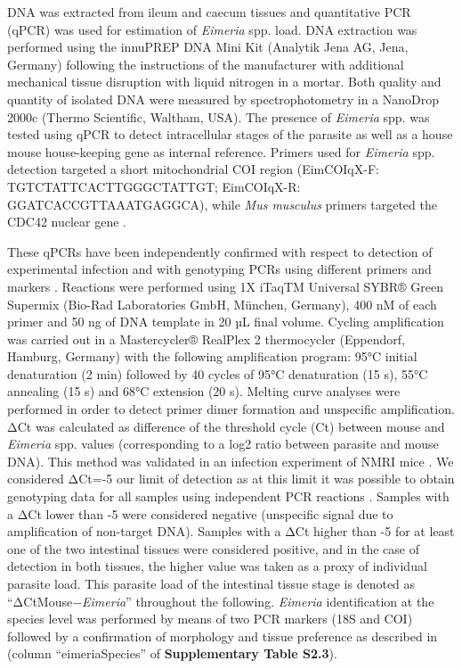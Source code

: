 \par 
DNA was extracted from ileum and caecum tissues and quantitative PCR (qPCR) was used for estimation of \textit{Eimeria} spp. load. DNA extraction was performed using the innuPREP DNA Mini Kit (Analytik Jena AG, Jena, Germany) following the instructions of the manufacturer with additional mechanical tissue disruption with liquid nitrogen in a mortar. Both quality and quantity of isolated DNA were measured by spectrophotometry in a NanoDrop 2000c (Thermo Scientific, Waltham, USA). The presence of \textit{Eimeria} spp. was tested using qPCR to detect intracellular stages of the parasite as well as a house mouse house-keeping gene as internal reference. Primers used for \textit{Eimeria} spp. detection targeted a short mitochondrial COI region (Eim\textunderscore COI\textunderscore qX-F:  TGTCTATTCACTTGGGCTATTGT; Eim\textunderscore COI\textunderscore qX-R: GGATCACCGTTAAATGAGGCA), while \textit{Mus musculus} primers targeted the CDC42 nuclear gene \parencite[Ms\textunderscore gDNA\textunderscore CDC42\textunderscore F: CTCTCCTCCCCTCTGTCTTG; Ms\textunderscore gDNA\textunderscore CDC42\textunderscore R: TCCTTTTGGGTTGAGTTTCC; ][]{al-khlifeh_eimeria_2019, jarquin-diaz_detection_2019}.
\par These qPCRs have been independently confirmed with respect to detection of experimental infection \citep{al-khlifeh_eimeria_2019} and with genotyping PCRs using different primers and markers \citep{jarquin-diaz_detection_2019}. Reactions were performed using 1X iTaqTM Universal SYBR® Green Supermix (Bio-Rad Laboratories GmbH, München, Germany), 400 nM of each primer and 50 ng of DNA template in 20 µL final volume. Cycling amplification was carried out in a Mastercycler® RealPlex 2 thermocycler (Eppendorf, Hamburg, Germany) with the following amplification program: 95°C initial denaturation (2 min) followed by 40 cycles of 95°C denaturation (15 s), 55°C annealing (15 s) and 68°C extension (20 s). Melting curve analyses were performed in order to detect primer dimer formation and unspecific amplification. ΔCt was calculated as difference of the threshold cycle (Ct) between mouse and \textit{Eimeria} spp. values (corresponding to a log2 ratio between parasite and mouse DNA). This method was validated in an infection experiment of NMRI mice \citep{al-khlifeh_eimeria_2019}. We considered ΔCt=-5 our limit of detection as at this limit it was possible to obtain genotyping data for all samples using independent PCR reactions \citep{ahmed_novel_2019, jarquin-diaz_detection_2019}. Samples with a ΔCt lower than -5 were considered negative (unspecific signal due to amplification of non-target DNA). Samples with a ΔCt higher than -5 for at least one of the two intestinal tissues were considered positive, and in the case of detection in both tissues, the higher value was taken as a proxy of individual parasite load. This parasite load of the intestinal tissue stage is denoted as “ΔCtMouse−\textit{Eimeria}” throughout the following. \textit{Eimeria} identification at the species level was performed by means of two PCR markers (18S and COI) followed by a confirmation of morphology and tissue preference as described in \cite{jarquin-diaz_detection_2019} (column “eimeriaSpecies” of \textbf{Supplementary Table S2.3}).

